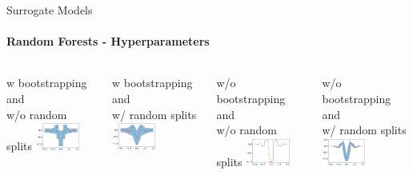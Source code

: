 \begin{frame}[c]{Surrogate Models}
\framesubtitle{Random Forests - Hyperparameters}

\begin{columns}
	\centering
	w bootstrapping and\\ w/o random splits
	\includegraphics[width=0.5\textwidth]{images/surrogate_models/rf_boot_middle_split.png}

	w bootstrapping and\\ w/ random splits
	\includegraphics[width=0.5\textwidth]{images/surrogate_models/rf_boot_rand_split.png}

	\centering
	w/o bootstrapping and\\ w/o random splits
	\includegraphics[width=0.5\textwidth]{images/surrogate_models/rf_noboot_middle_split.png}
	
	w/o bootstrapping and\\ w/ random splits
	\includegraphics[width=0.5\textwidth]{images/surrogate_models/rf_noboot_rand_split.png}
\end{columns}

\end{frame}
